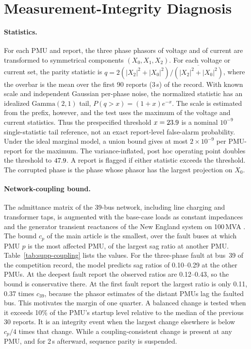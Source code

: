 \section{Measurement-Integrity Diagnosis}
\label{sec:supp-integrity}

\paragraph{Statistics.} For each PMU and report, the three phase phasors of
voltage and of current are transformed to symmetrical components
$(X_0,X_1,X_2)$. For each voltage or current set, the parity statistic is
$q=2(|X_2|^2+|X_0|^2)/\overline{(|X_2|^2+|X_0|^2)}$, where the overbar is
the mean over the first 90 reports (3\,s) of the record. With known scale
and independent Gaussian per-phase noise, the normalized statistic has an
idealized $\mathrm{Gamma}(2,1)$ tail,
$P(q>x)=(1+x)e^{-x}$. The scale is estimated from the prefix, however, and
the test uses the maximum of the voltage and current statistics. Thus the
prespecified threshold $x=23.9$ is a nominal $10^{-9}$ single-statistic
tail reference, not an exact report-level false-alarm probability. Under
the ideal marginal model, a union bound gives at most $2\times10^{-9}$ per
PMU-report for the maximum. The variance-inflated, post hoc operating point
doubles the threshold to $47.9$. A report is flagged if either
statistic exceeds the threshold. The corrupted phase is the phase whose
phasor has the largest projection on $X_0$.

\paragraph{Network-coupling bound.} The admittance matrix of the 39-bus
network, including line charging and transformer taps, is augmented with
the base-case loads as constant impedances and the generator transient
reactances of the New England system on 100\,MVA \cite{pai1989energy}.
The bound $c_p$ of the main article is the smallest, over the fault buses
at which PMU $p$ is the most affected PMU, of the largest sag ratio at
another PMU. Table~\ref{tab:supp-coupling} lists the values. For the
three-phase fault at bus~39 of the competition record, the model predicts
sag ratios of 0.10--0.29 at the other PMUs. At the deepest fault report
the observed ratios are 0.12--0.43, so the bound is conservative there. At
the first fault report the largest ratio is only 0.11, 0.37 times $c_{39}$,
because the phasor estimates of the distant PMUs lag the faulted bus. This
motivates the margin of one quarter. A balanced change is
tested when it exceeds 10\% of the PMU's startup level relative to the
median of the previous 30 reports. It is an integrity event when the
largest change elsewhere is below $c_p/4$ times that change. While a
coupling-consistent change is present at any PMU, and for 2\,s afterward,
sequence parity is suspended.

